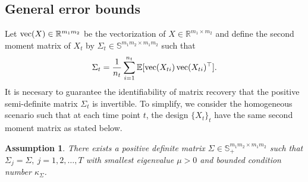\documentclass[12pt]{article}
\newcommand{\myvec}[1]%
{\stackrel{\raisebox{-2pt}[0pt][0pt]{\tiny$\rightharpoonup$}}{#1}}
\newtheorem{assump}{Assumption}
\def\myvec{\mathop{\rm vec}}
\def\Tr{\operatorname{Tr}}
\begin{document}
 \subsection{General error bounds}




  Let $\myvec(X)\in \mathbb{R}^{m_1m_2}$ be the vectorization of $X \in \mathbb{R}^{m_1\times m_2}$ and define the second moment matrix of $X_{t}$ by $\Sigma_{t}\in \mathbb{S}^{m_1m_2\times m_1m_2}$ such that
  \begin{equation*}
  \Sigma_{t} = \frac{1}{n_t}\sum_{i=1}^{n_t}\mathbb{E} [\myvec({X}_{ti})\myvec({X}_{ti})^\top].
  \end{equation*}
  It is necesary to guarantee the identifiability of matrix recovery that the positive semi-definite matrix $\Sigma_{t}$ is invertible.
  To simplify, we consider the homogeneous scenario such that at each time point $t$, the design $\{X_t\}_t$ have the same second moment matrix as stated below.
  \begin{assump}
  \label{assump_Sigma}
  There exists a positive definite matrix $\Sigma \in \mathbb{S}_{+}^{m_1m_2\times m_1m_2}$ such that $\Sigma_j=\Sigma,\ j=1,2,\dots,T$ with smallest eigenvalue $\mu>0$ and bounded condition number $\kappa_{\Sigma}$.
  \end{assump}
\end{document}
